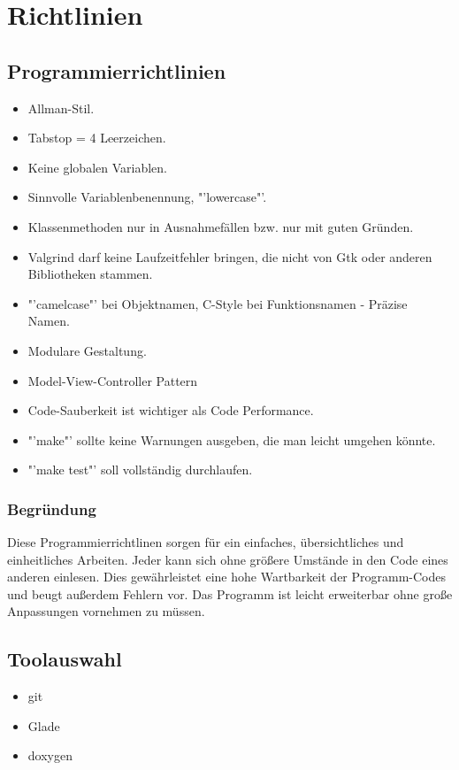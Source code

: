 \chapter{Richtlinien}
\section{Programmierrichtlinien}
\renewcommand{\labelitemi}{•}
\begin{itemize}
\item Allman-Stil.
\item Tabstop = 4 Leerzeichen.
\item Keine globalen Variablen.
\item Sinnvolle Variablenbenennung, "'lowercase"'.
\item Klassenmethoden nur in Ausnahmefällen bzw. nur mit guten Gründen.
\item Valgrind darf keine Laufzeitfehler bringen, die nicht von Gtk oder anderen Bibliotheken stammen.
\item "'camelcase"' bei Objektnamen, C-Style bei Funktionsnamen - Präzise Namen.
\item Modulare Gestaltung.
\item Model-View-Controller Pattern
\item Code-Sauberkeit ist wichtiger als Code Performance.
\item "'make"' sollte keine Warnungen ausgeben, die man leicht umgehen könnte.
\item "'make test"' soll vollständig durchlaufen.
\end{itemize}
\subsection{Begründung}
Diese Programmierrichtlinen sorgen für ein einfaches, übersichtliches und einheitliches Arbeiten.
Jeder kann sich ohne größere Umstände in den Code eines anderen einlesen. Dies gewährleistet eine
hohe Wartbarkeit der Programm-Codes und beugt außerdem Fehlern vor. Das Programm ist leicht
erweiterbar ohne große Anpassungen vornehmen zu müssen.
\section{Toolauswahl}
\begin{itemize}
\item git
\item Glade
\item doxygen
\end{itemize}
